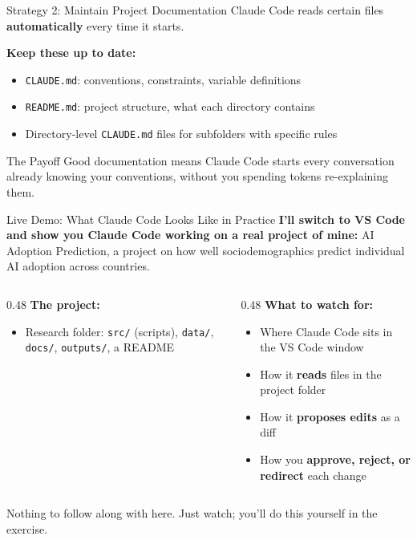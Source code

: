 \documentclass[aspectratio=169, 11pt]{beamer}
\begin{document}
\begin{frame}{Strategy 2: Maintain Project Documentation}
  Claude Code reads certain files \textbf{automatically} every time it starts.

  \vspace{0.5em}
  \textbf{Keep these up to date:}
  \begin{itemize}
    \item \texttt{CLAUDE.md}: conventions, constraints, variable definitions
    \item \texttt{README.md}: project structure, what each directory contains
    \item Directory-level \texttt{CLAUDE.md} files for subfolders with specific rules
  \end{itemize}

  \vspace{0.5em}
  \begin{block}{The Payoff}
    Good documentation means Claude Code starts every conversation already knowing your conventions, without you spending tokens re-explaining them.
  \end{block}
\end{frame}

\begin{frame}{Live Demo: What Claude Code Looks Like in Practice}
  \textbf{I'll switch to VS Code and show you Claude Code working on a real project of mine:} \alert{AI Adoption Prediction}, a project on how well sociodemographics predict individual AI adoption across countries.

  \vspace{0.5em}
  \begin{columns}[T]
    \begin{column}{0.48\textwidth}
      \textbf{The project:}
      \begin{itemize}
        \item Research folder: \texttt{src/} (scripts), \texttt{data/}, \texttt{docs/}, \texttt{outputs/}, a README
      \end{itemize}
    \end{column}
    \begin{column}{0.48\textwidth}
      \textbf{What to watch for:}
      \begin{itemize}
        \item Where Claude Code sits in the VS Code window
        \item How it \textbf{reads} files in the project folder
        \item How it \textbf{proposes edits} as a diff
        \item How you \textbf{approve, reject, or redirect} each change
      \end{itemize}
    \end{column}
  \end{columns}

  \vspace{0.5em}
  \alert{Nothing to follow along with here. Just watch; you'll do this yourself in the exercise.}
\end{frame}
\end{document}
